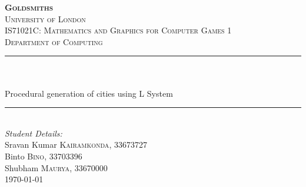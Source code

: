 \begin{titlepage}

\newcommand{\HRule}{\rule{\linewidth}{0.5mm}} %

\center %

\vspace*{\fill}\begin{center}
 
\textsc{\Huge \textbf {Goldsmiths}}\\ %
\textsc{\small University of London}\\[1.5cm] %
\textsc{\large IS71021C: Mathematics and Graphics for Computer Games 1}\\[0.5cm]
\textsc{\large Department of Computing}\\[0.5cm] %

\makeatletter
\HRule \\[0.4cm]
{ \huge \bfseries \@title}\\[0.1cm] \large Procedural generation of cities using L System
\HRule \\[1.5cm]
 
\Large \emph{Student Details:}\\ [0.2cm]
\large Sravan Kumar \textsc{Kairamkonda}, 33673727\\[0.2cm]
\large Binto \textsc{Bino}, 33703396\\[0.2cm]
\large Shubham \textsc{Maurya}, 33670000\\[2cm] %


{\large \today}\\[2cm] %


\end{center}\vspace*{\fill}
\end{titlepage}